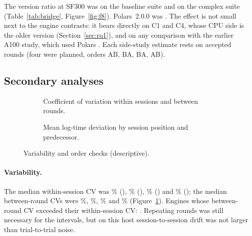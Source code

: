 \documentclass[11pt]{article}
\begin{document}
The version ratio at SF300 was  on the
baseline suite and  on the complex suite
(Table~\ref{tab:bridge}, Figure~\ref{fig:f8}). Polars~2.0.0 was
. The effect is
not small next to the engine contrasts: it bears directly on C1 and C4, whose
CPU side is the older version (Section~\ref{sec:rq1}), and on any comparison
with the earlier A100 study, which used Polars .
Each side-study estimate rests on
 accepted rounds (four were planned,
orders AB, BA, BA, AB).

\subsection{Secondary analyses}
\label{sec:secondary}

\begin{figure}[t]
\centering
\begin{subfigure}[t]{0.49\linewidth}
  \centering{}
  \caption{Coefficient of variation within sessions and between rounds.}
  \label{fig:f5}
\end{subfigure}\hfill
\begin{subfigure}[t]{0.49\linewidth}
  \centering{}
  \caption{Mean log-time deviation by session position and predecessor.}
  \label{fig:f6}
\end{subfigure}
\caption{Variability and order checks (descriptive). \chartnote}
\label{fig:f56}
\end{figure}

\paragraph{Variability.} The median within-session CV was
\% (\polarscpu{}),
\% (\polarsgpu{}),
\% (\sparkcpu{}) and
\% (\sparkgpu{}); the median between-round CVs
were \%, \%,
\% and \%
(Figure~\ref{fig:f5}). Engines whose between-round CV exceeded their
within-session CV: . Repeating rounds was
still necessary for the intervals, but on this host session-to-session drift
was not larger than trial-to-trial noise.
\end{document}

